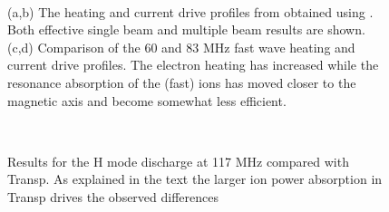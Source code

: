  \begin{figure}[hbt] %
 \centering 
\begin{narrow}{-.50in}{0in}   
 \mbox{}
\\[20pt]
 \mbox{}
\end{narrow}
 \caption{(a,b) The heating and current drive profiles from \ct obtained
   using \ot. Both effective single beam and multiple beam results are
   shown.
    (c,d) Comparison of the 60 and 83 MHz fast wave heating and current
    drive profiles. The electron heating has increased
    while the resonance absorption of the (fast) ions has moved closer to
    the magnetic axis and become somewhat less efficient.}
  \label{Figbwav3a}
 \end{figure}

 \begin{figure}[hbt] %
 \centering 
\begin{narrow}{-.50in}{0in}   
 \mbox{}
\\[20pt]
 \mbox{}
\end{narrow}
 \caption{Results for the H mode discharge at 117 MHz compared with
   Transp. As explained in the text the larger ion power absorption in Transp drives the observed differences}
  \label{Figbwav3b}
 
 \end{figure}

